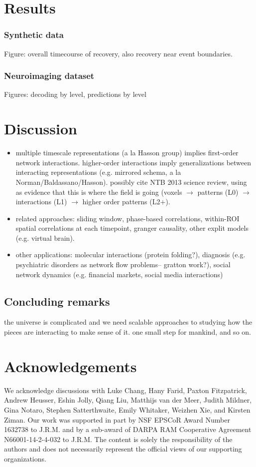 \documentclass[english]{article}
\begin{document}
\section*{Results}
\subsubsection*{Synthetic data}
Figure: overall timecourse of recovery, also recovery near
event boundaries.

\subsubsection*{Neuroimaging dataset~\citep{SimoEtal16}}
Figures: decoding by level, predictions by level


\section*{Discussion}
\begin{itemize}
\item multiple timescale representations (a la Hasson group) implies
first-order network interactions.  higher-order interactions imply
generalizations between interacting representations (e.g. mirrored
schema, a la Norman/Baldassano/Hasson).  possibly cite NTB 2013
science review, using as evidence that this is where the field is
going (voxels $\rightarrow$ patterns (L0) $\rightarrow$ interactions (L1) $\rightarrow$ higher
order patterns (L2$+$).
\item related approaches: sliding window, phase-based correlations,
within-ROI spatial correlations at each timepoint, granger
causality, other explit models (e.g. virtual brain).
\item other applications: molecular interactions (protein folding?),
diagnosis (e.g. psychiatric disorders as network flow problems--
gratton work?), social network dynamics (e.g. financial markets,
social media interactions)
\end{itemize}

\subsection*{Concluding remarks}
the universe is complicated and we need scalable approaches to
studying how the pieces are interacting to make sense of it.  one
small step for mankind, and so on.

\section*{Acknowledgements}
We acknowledge discussions with Luke Chang, Hany Farid, Paxton
Fitzpatrick, Andrew Heusser, Eshin Jolly, Qiang Liu, Matthijs van der
Meer, Judith Mildner, Gina Notaro, Stephen Satterthwaite, Emily
Whitaker, Weizhen Xie, and Kirsten Ziman. Our work was supported in
part by NSF EPSCoR Award Number 1632738 to J.R.M. and by a sub-award
of DARPA RAM Cooperative Agreement N66001-14-2-4-032 to J.R.M.  The
content is solely the responsibility of the authors and does not
necessarily represent the official views of our supporting
organizations.
\end{document}
